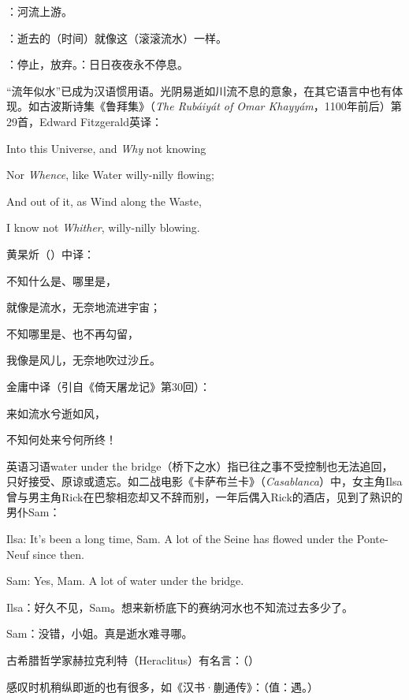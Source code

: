 {
\item {}：河流上游。
\item {}：逝去的（时间）就像这（滚滚流水）一样。
\item {}：停止，放弃。：日日夜夜永不停息。
}
{
“流年似水”已成为汉语惯用语。光阴易逝如川流不息的意象，在其它语言中也有体现。如古波斯诗集《鲁拜集》（\emph{The Rubáiyát of Omar Khayyám}，1100年前后）第29首，Edward Fitzgerald英译：
\begin{lyquotepoeme}
Into this Universe, and \emph{Why} not knowing

Nor \emph{Whence}, like Water willy-nilly flowing;

And out of it, as Wind along the Waste,

I know not \emph{Whither}, willy-nilly blowing.
\end{lyquotepoeme}
黄杲炘（）中译：
\begin{lyquotepoem}
不知什么是、哪里是，

就像是流水，无奈地流进宇宙；

不知哪里是、也不再勾留，

我像是风儿，无奈地吹过沙丘。
\end{lyquotepoem}
金庸中译（引自《倚天屠龙记》第30回）：
\begin{lyquotepoem}
来如流水兮逝如风，

不知何处来兮何所终！
\end{lyquotepoem}

英语习语water under the bridge（桥下之水）指已往之事不受控制也无法追回，只好接受、原谅或遗忘。如二战电影《卡萨布兰卡》（\emph{Casablanca}）中，女主角Ilsa曾与男主角Rick在巴黎相恋却又不辞而别，一年后偶入Rick的酒店，见到了熟识的男仆Sam：

\begin{lyquotepara}
Ilsa: It's been a long time, Sam. A lot of the Seine has flowed under the Ponte-Neuf since then.

Sam: Yes, Mam. A lot of water under the bridge.

Ilsa：好久不见，Sam。想来新桥底下的赛纳河水也不知流过去多少了。

Sam：没错，小姐。真是逝水难寻哪。
\end{lyquotepara}

古希腊哲学家赫拉克利特（Heraclitus）有名言：（）

感叹时机稍纵即逝的也有很多，如《汉书·蒯通传》：（值：遇。）
}


